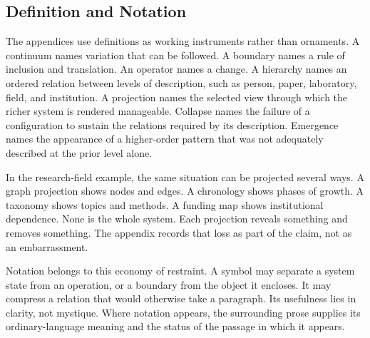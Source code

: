 \documentclass[11pt,a4paper,openany]{book}
\begin{document}
\subsection{Definition and Notation}
The appendices use definitions as working instruments rather than ornaments. A continuum names variation that can be followed. A boundary names a rule of inclusion and translation. An operator names a change. A hierarchy names an ordered relation between levels of description, such as person, paper, laboratory, field, and institution. A projection names the selected view through which the richer system is rendered manageable. Collapse names the failure of a configuration to sustain the relations required by its description. Emergence names the appearance of a higher-order pattern that was not adequately described at the prior level alone. \cite{raf_networks,bak_soc}\par
In the research-field example, the same situation can be projected several ways. A graph projection shows nodes and edges. A chronology shows phases of growth. A taxonomy shows topics and methods. A funding map shows institutional dependence. None is the whole system. Each projection reveals something and removes something. The appendix records that loss as part of the claim, not as an embarrassment.\par
Notation belongs to this economy of restraint. A symbol may separate a system state from an operation, or a boundary from the object it encloses. It may compress a relation that would otherwise take a paragraph. Its usefulness lies in clarity, not mystique. Where notation appears, the surrounding prose supplies its ordinary-language meaning and the status of the passage in which it appears.\par
\end{document}
